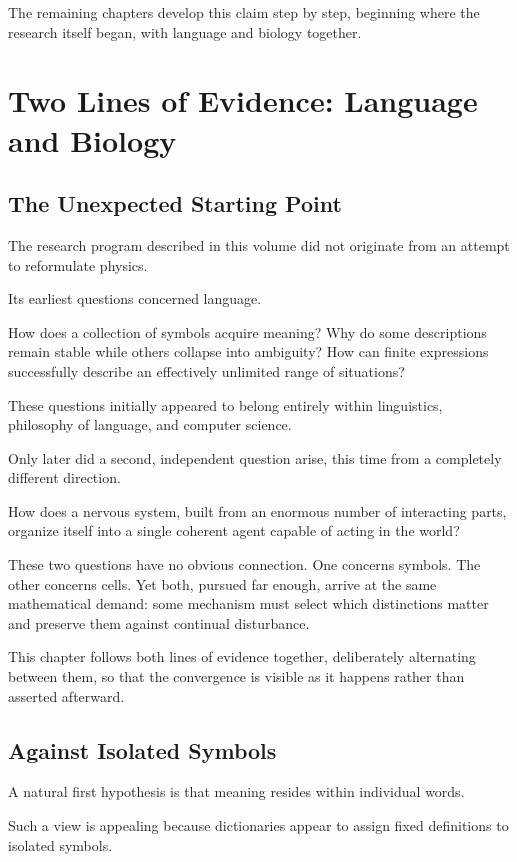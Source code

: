 \documentclass[11pt,oneside]{book}
\numberwithin{equation}{chapter}
\theoremstyle{definition}
\theoremstyle{plain}
\begin{document}
The remaining chapters develop this claim step by step, beginning where the
research itself began, with language and biology together.

\chapter{Two Lines of Evidence: Language and Biology}

\section{The Unexpected Starting Point}

The research program described in this volume did not originate from an
attempt to reformulate physics.

Its earliest questions concerned language.

How does a collection of symbols acquire meaning?
Why do some descriptions remain stable while others collapse into ambiguity?
How can finite expressions successfully describe an effectively unlimited
range of situations?

These questions initially appeared to belong entirely within linguistics,
philosophy of language, and computer science.

Only later did a second, independent question arise, this time from a
completely different direction.

How does a nervous system, built from an enormous number of interacting
parts, organize itself into a single coherent agent capable of acting in the
world?

These two questions have no obvious connection. One concerns symbols. The
other concerns cells. Yet both, pursued far enough, arrive at the same
mathematical demand: some mechanism must select which distinctions matter
and preserve them against continual disturbance.

This chapter follows both lines of evidence together, deliberately
alternating between them, so that the convergence is visible as it happens
rather than asserted afterward.

\section{Against Isolated Symbols}

A natural first hypothesis is that meaning resides within individual words.

Such a view is appealing because dictionaries appear to assign fixed
definitions to isolated symbols.
\end{document}
